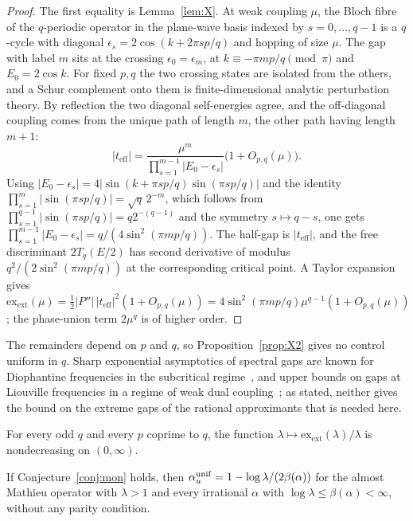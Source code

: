 \begin{proof}
The first equality is Lemma~\ref{lem:X}. At weak coupling $\mu$, the Bloch fibre of the $q$-periodic operator in the plane-wave basis indexed by $s=0,\dots,q-1$ is a $q$-cycle with diagonal $\epsilon_s=2\cos(k+2\pi sp/q)$ and hopping of size $\mu$. The gap with label $m$ sits at the crossing $\epsilon_0=\epsilon_m$, at $k\equiv-\pi mp/q\pmod\pi$ and $E_0=2\cos k$. For fixed $p,q$ the two crossing states are isolated from the others, and a Schur complement onto them is finite-dimensional analytic perturbation theory. By reflection the two diagonal self-energies agree, and the off-diagonal coupling comes from the unique path of length $m$, the other path having length $m+1$:
\[
|t_{\mathrm{eff}}|=\frac{\mu^m}{\prod_{s=1}^{m-1}|E_0-\epsilon_s|}\bigl(1+O_{p,q}(\mu)\bigr).
\]
Using $|E_0-\epsilon_s|=4|\sin(k+\pi sp/q)\sin(\pi sp/q)|$ and the identity $\prod_{s=1}^{m}|\sin(\pi sp/q)|=\sqrt q\,2^{-m}$, which follows from $\prod_{s=1}^{q-1}|\sin(\pi sp/q)|=q2^{-(q-1)}$ and the symmetry $s\mapsto q-s$, one gets $\prod_{s=1}^{m-1}|E_0-\epsilon_s|=q/(4\sin^2(\pi mp/q))$. The half-gap is $|t_{\mathrm{eff}}|$, and the free discriminant $2T_q(E/2)$ has second derivative of modulus $q^2/(2\sin^2(\pi mp/q))$ at the corresponding critical point. A Taylor expansion gives $\mathrm{ex}_{\mathrm{ext}}(\mu)=\frac12|P''|\,|t_{\mathrm{eff}}|^2(1+O_{p,q}(\mu))=4\sin^2(\pi mp/q)\mu^{q-1}(1+O_{p,q}(\mu))$; the phase-union term $2\mu^q$ is of higher order.
\end{proof}

The remainders depend on $p$ and $q$, so Proposition~\ref{prop:X2} gives no control uniform in $q$. Sharp exponential asymptotics of spectral gaps are known for Diophantine frequencies in the subcritical regime~\cite{LYZZ2017}, and upper bounds on gaps at Liouville frequencies in a regime of weak dual coupling~\cite[Theorem~1.3]{LiuShi2019}; as stated, neither gives the bound on the extreme gaps of the rational approximants that is needed here.

\begin{conjecture}[Mon]\label{conj:mon}
For every odd $q$ and every $p$ coprime to $q$, the function $\lambda\mapsto\mathrm{ex}_{\mathrm{ext}}(\lambda)/\lambda$ is nondecreasing on $(0,\infty)$.
\end{conjecture}

\begin{proposition}\label{prop:X4}
If Conjecture~\ref{conj:mon} holds, then $\alpha_u^{\mathrm{unif}}=1-\log\lambda/(2\beta(\alpha))$ for the almost Mathieu operator with $\lambda>1$ and every irrational $\alpha$ with $\log\lambda\le\beta(\alpha)<\infty$, without any parity condition.
\end{proposition}

